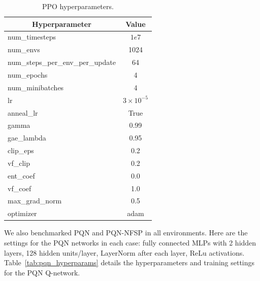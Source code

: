 \begin{table}[htbp]
    \caption{PPO hyperparameters.}
    \begin{center}
        \begin{tabular}{lc}
        \hline
            \multicolumn{1}{c}{Hyperparameter} & \multicolumn{1}{c}{Value} \\ \hline
            num\_timesteps & $1e7$ \\
            num\_envs & 1024 \\
            num\_steps\_per\_env\_per\_update & 64 \\
            num\_epochs & 4 \\
            num\_minibatches & 4 \\
            lr & $3\times10^{-5}$ \\
            anneal\_lr & True \\
            gamma & 0.99 \\
            gae\_lambda & 0.95 \\
            clip\_eps & 0.2 \\
            vf\_clip & 0.2 \\
            ent\_coef & 0.0 \\
            vf\_coef & 1.0 \\
            max\_grad\_norm & 0.5 \\
            optimizer & adam \\
            \hline
        \end{tabular}
    \end{center}
    \label{tab:ppo_hyperparams}
\end{table}

We also benchmarked PQN and PQN-NFSP in all environments. Here are the settings for the PQN networks in each case: fully connected MLPs with 2 hidden layers, 128 hidden units/layer, LayerNorm after each layer, ReLu activations. Table~\ref{tab:pqn_hyperparams} details the hyperparameters and training settings for the PQN Q-network.

